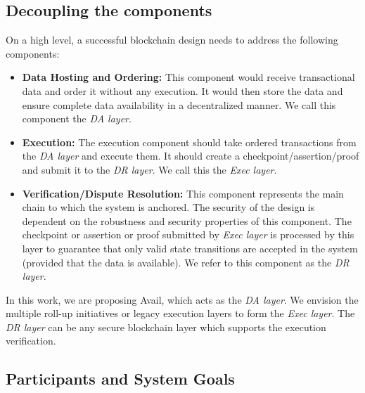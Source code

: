 \documentclass[sigconf, screen=true, nonacm]{acmart}
\newcommand{\DA}{\textit{DA layer}}
\newcommand{\EX}{\textit{Exec layer}}
\newcommand{\DR}{\textit{DR layer}}
\begin{document}
    \subsection{Decoupling the components}
        On a high level, a successful blockchain design needs to address the following components:
        \begin{itemize}
            \item \textbf{Data Hosting and Ordering:} This component would receive transactional data and order it without any execution. It would then store the data and ensure complete data availability in a decentralized manner. We call this component the \DA.
            \item \textbf{Execution:} The execution component should take ordered transactions from the \DA{} and execute them. It should create a checkpoint/assertion/proof and submit it to the \DR. We call this the \EX.
            \item \textbf{Verification/Dispute Resolution:} This component represents the main chain to which the system is anchored. The security of the design is dependent on the robustness and security properties of this component. The checkpoint or assertion or proof submitted by \EX{} is processed by this layer to guarantee that only valid state transitions are accepted in the system (provided that the data is available). We refer to this component as the \DR. 
        \end{itemize}

        In this work, we are proposing Avail, which acts as the \DA. We envision the multiple roll-up initiatives or legacy execution layers to form the \EX. The \DR{} can be any secure blockchain layer which supports the execution verification.
    
    \subsection{Participants and System Goals}
\end{document}
